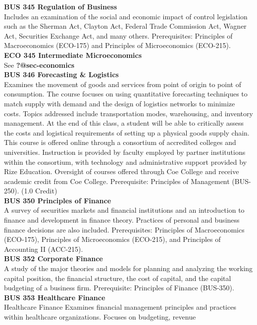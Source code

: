 \documentclass[
  letterpaper,
]{scrbook}
\begin{document}
\textbf{BUS 345 Regulation of Business}\\
Includes an examination of the social and economic impact of control
legislation such as the Sherman Act, Clayton Act, Federal Trade
Commission Act, Wagner Act, Securities Exchange Act, and many others.
Prerequisites: Principles of Macroeconomics (ECO-175) and Principles of
Microeconomics (ECO-215).\\
\textbf{ECO 345 Intermediate Microeconomics}\\
See \textbf{?@sec-economics}\\
\textbf{BUS 346 Forecasting \& Logistics}\\
Examines the movement of goods and services from point of origin to
point of consumption. The course focuses on using quantitative
forecasting techniques to match supply with demand and the design of
logistics networks to minimize costs. Topics addressed include
transportation modes, warehousing, and inventory management. At the end
of this class, a student will be able to critically assess the costs and
logistical requirements of setting up a physical goods supply chain.
This course is offered online through a consortium of accredited
colleges and universities. Instruction is provided by faculty employed
by partner institutions within the consortium, with technology and
administrative support provided by Rize Education. Oversight of courses
offered through Coe College and receive academic credit from Coe
College. Prerequisite: Principles of Management (BUS-250). (1.0
Credit)\\
\textbf{BUS 350 Principles of Finance}\\
A survey of securities markets and financial institutions and an
introduction to finance and development in finance theory. Practices of
personal and business finance decisions are also included.
Prerequisites: Principles of Macroeconomics (ECO-175), Principles of
Microeconomics (ECO-215), and Principles of Accounting II (ACC-215).\\
\textbf{BUS 352 Corporate Finance}\\
A study of the major theories and models for planning and analyzing the
working capital position, the financial structure, the cost of capital,
and the capital budgeting of a business firm. Prerequisite: Principles
of Finance (BUS-350).\\
\textbf{BUS 353 Healthcare Finance}\\
Healthcare Finance Examines financial management principles and
practices within healthcare organizations. Focuses on budgeting, revenue
\end{document}

